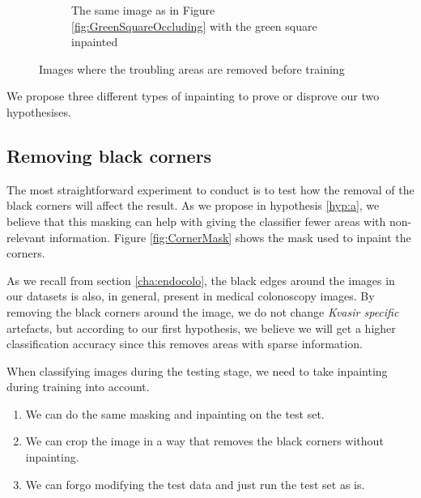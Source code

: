 \begin{figure}
\begin{subfigure}[t]{0.4\textwidth}
         \caption{The same image as in Figure \ref{fig:GreenSquareOccluding} with the green square inpainted}
         \label{fig:GreenSquareOccludingFIX}
     \end{subfigure}
        \caption{Images where the troubling areas are removed before training}
        \label{fig:KvasirAnomaliesFIX}
\end{figure}


We propose three different types of inpainting to prove or disprove our two hypothesises.
\FloatBarrier
\subsection{Removing black corners}
The most straightforward experiment to conduct is to test how the removal of the black corners will affect the result.
As we propose in hypothesis \ref{hyp:a}, we believe that this masking can help with giving the classifier fewer areas with non-relevant information.
Figure \ref{fig:CornerMask} shows the mask used to inpaint the corners.

As we recall from section \ref{cha:endocolo}, the black edges around the images in our datasets is also, in general, present in medical colonoscopy images. By removing the black corners around the image, we do not change \textit{Kvasir specific} artefacts, but according to our first hypothesis, we believe we will get a higher classification accuracy since this removes areas with sparse information.

When classifying images during the testing stage, we need to take inpainting during training into account. 
\begin{enumerate}
\item We can do the same masking and inpainting on the test set. 
\item We can crop the image in a way that removes the black corners without inpainting.
\item We can forgo modifying the test data and just run the test set as is. 
\end{enumerate}


